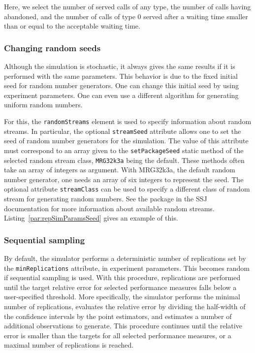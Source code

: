 Here, we select the number of served calls of any type,
the number of calls having abandoned,
and the number of calls of type 0 served after a waiting time
smaller than or equal to the acceptable waiting time.

\subsubsection{Changing random seeds}
\label{sec:seeds}

Although the simulation is stochastic, it always gives the same
results if it is performed with the same parameters.
This behavior is due to the fixed initial seed for random number
generators.
One can change this initial seed by using experiment parameters.
One can even use a different algorithm for generating uniform random
numbers.

For this,
the \texttt{random\-Streams} element is used to specify information
about random streams. In particular, the
optional \texttt{stream\-Seed} attribute allows one to set the
seed of random number generators for the simulation.  The value of
this attribute must correspond to an array given to the
\texttt{set\-Package\-Seed} static method of the selected random stream
class, \texttt{MRG32k3a} being the default.
These methods often take an array of integers as
argument.  With MRG32k3a, the default random number generator, one
needs an array of six integers to
represent the seed.
The optional attribute \texttt{stream\-Class} can be
used to specify a different class of random stream for generating
random numbers.  See the package  in
the SSJ documentation \cite{iLEC04j} for more
information about available random streams.
Listing~\ref{par:repSimParamsSeed} gives an example of this.



\subsubsection{Sequential sampling}

By default, the simulator performs a deterministic number of
replications set by the \texttt{min\-Replications} attribute, in
experiment parameters.
This becomes random if sequential sampling is used.
With this procedure, replications are performed until the target
relative error for selected performance measures falls below a
user-specified threshold.
More specifically, the simulator performs the minimal number of
replications, evaluates the relative error by dividing the half-width
of the confidence intervals by the point estimators, and estimates a
number of additional observations to generate.
This procedure continues until the relative error is smaller than the
targets for all selected performance measures, or a maximal number of
replications is reached.

